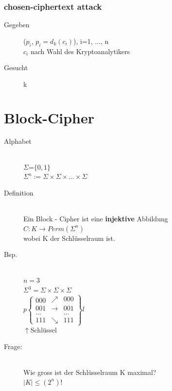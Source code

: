\documentclass[10pt]{article}
\newcommand{\ra}{\rightarrow}
\newcommand{\Brackal}[2]{\left\lbrace\begin{array}{#1} #2 \end{array}\right.} %
\newcommand{\Brackar}[2]{\left.\begin{array}{#1} #2 \end{array}\right\rbrace} %
\begin{document}
\subsubsection{chosen-ciphertext attack}
\begin{description}
	\item[Gegeben] ($p_i$, $p_i=d_k(c_i)$), i=1, ..., n \\
		$c_i$ nach Wahl des Kryptoanalytikers
	\item[Gesucht] k
\end{description}
\pagebreak
\section{Block-Cipher}
\begin{description}
	\item[Alphabet] \hfill \\
		$\Sigma$=$\{0,1\}$ \\
		$\Sigma^n := \Sigma \times \Sigma \times \dots \times \Sigma$ 
	\item[Definition] \hfill \\
		Ein Block - Cipher ist eine \textbf{injektive} Abbildung \\
		$C: K \ra Perm(\Sigma^n)$ \\
		wobei K der Schlüsselraum ist.
	\item[Bsp.] \hfill \\
		$n=3$ \\
		$\Sigma^3=\Sigma\times\Sigma\times\Sigma$\\
$p\Brackal{c}{000\\001\\\dots\\111}\Brackar{cc}{\nearrow&000\\\to&001\\&\dots\\\searrow&111}l$\\
\hspace*{1.8cm}$\uparrow$Schlüssel\\
	\item[Frage:] \hfill \\
		Wie gross ist der Schlüsselraum K maximal? \\
		$|K| \leq (2^n)!$
\end{description}
\end{document}
